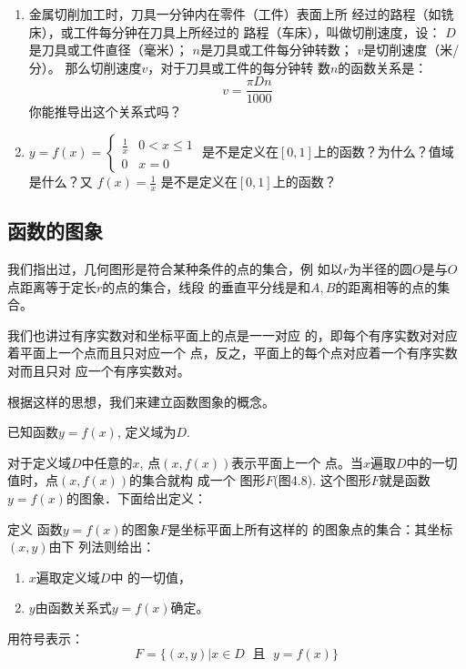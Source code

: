 \begin{enumerate}
\item 金属切削加工时，刀具一分钟内在零件（工件）表面上所
经过的路程（如铣床），或工件每分钟在刀具上所经过的
路程（车床），叫做切削速度，设：
$D$是刀具或工件直径（毫米）；
$n$是刀具或工件每分钟转数；
$v$是切削速度（米/分）。
那么切削速度$v$，对于刀具或工件的每分钟转
数$n$的函数关系是：
\[v=\frac{\pi Dn}{1000}\]
你能推导出这个关系式吗？
\item $y=f(x)=\begin{cases}
    \frac{1}{x} & 0<x\le 1\\ 0& x=0
\end{cases}$
是不是定义在$[0,1]$上的函数？为什么？值域是什么？又
$f(x)=\frac{1}{x}$
是不是定义在$[0,1]$上的函数？
\end{enumerate}

\subsection{函数的图象}
我们指出过，几何图形是符合某种条件的点的集合，例
如以$r$为半径的圆$O$是与$O$点距离等于定长$r$的点的集合，线段
的垂直平分线是和$A,B$的距离相等的点的集合。

我们也讲过有序实数对和坐标平面上的点是一一对应
的，即每个有序实数对对应着平面上一个点而且只对应一个
点，反之，平面上的每个点对应着一个有序实数对而且只对
应一个有序实数对。

根据这样的思想，我们来建立函数图象的概念。

已知函数$y=f(x)$, 定义域为$D$.
\begin{figure}[htp]
    \centering
{}
    \caption{}
\end{figure}


对于定义域$D$中任意的$x$, 点$(x,f(x))$表示平面上一个
点。当$x$遍取$D$中的一切值时，点$(x,f(x))$的集合就构 成一个
图形$F$(图4.8). 这个图形$F$就是函数$y=f(x)$的图象．下面给出定义：

\begin{blk}{定义}
函数$y=f(x)$的图象$F$是坐标平面上所有这样的
的图象点的集合：其坐标$(x,y)$由下
列法则给出：
\begin{enumerate}
    \item $x$遍取定义域$D$中
的一切值，
\item $y$由函数关系式$y=f(x)$确定。
\end{enumerate}
用符号表示：
\[F=\{(x,y)|x\in D\; \text{ 且 }\; y=f(x)\}\]    
\end{blk}


